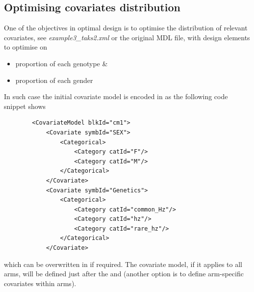 \subsection{Optimising covariates distribution}
One of the objectives in optimal design is to optimise the distribution of 
relevant covariates, see \emph{example3\_taks2.xml} or the original MDL file, with 
design elements to optimise on
\begin{itemize}
\item
proportion of each genotype \& 
\item
proportion of each gender
\end{itemize}
In such case the initial covariate model is encoded in  as the following
code snippet shows
\lstset{language=XML}
\begin{lstlisting}
        <CovariateModel blkId="cm1">
            <Covariate symbId="SEX">
                <Categorical>
                    <Category catId="F"/>
                    <Category catId="M"/>
                </Categorical>
            </Covariate>
            <Covariate symbId="Genetics">
                <Categorical>
                    <Category catId="common_Hz"/>
                    <Category catId="hz"/>
                    <Category catId="rare_hz"/>
                </Categorical>
            </Covariate>
\end{lstlisting}
which can be overwritten in  if required. 
The covariate model, if it applies to all arms, will be defined just after 
the  and  (another option is to define 
arm-specific covariates within arms).


